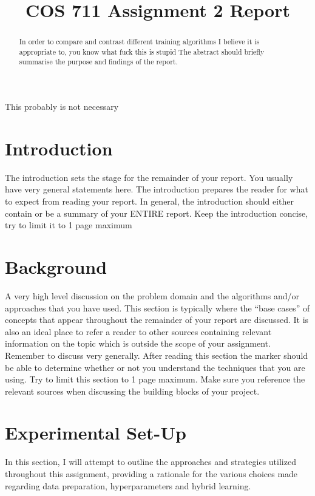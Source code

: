 \documentclass[conference]{IEEEtran}
\begin{document}
\title{COS 711 Assignment 2 Report\\
}

\author{
}

\maketitle

\begin{abstract}
In order to compare and contrast different training algorithms I believe it is appropriate to, you know what fuck this is stupid
The abstract should briefly summarise the purpose and findings of the report.
\end{abstract}

\begin{IEEEkeywords}
This probably is not necessary
\end{IEEEkeywords}

\section{Introduction}
The introduction sets the stage for the remainder of your report. You usually have very general statements here. The introduction prepares the reader for what to expect from reading your report. In general, the introduction should either contain or be a summary of your ENTIRE report. Keep the introduction concise, try to limit it to 1 page maximum

\section{Background}
A very high level discussion on the problem domain and the algorithms and/or approaches that you have used. This section is typically where the “base cases” of concepts that appear throughout the remainder of your report are discussed. It is also an ideal place to refer a reader to other sources containing relevant information on the topic which is outside the scope of your assignment. Remember to discuss very generally. After reading this section the marker should be able to determine whether or not you understand the techniques that you are using. Try to limit this section to 1 page maximum. Make sure you reference the relevant sources when discussing the building blocks of your project.

\section{Experimental Set-Up}
In this section, I will attempt to outline the approaches and strategies utilized throughout this assignment, providing a rationale for the various choices made regarding data preparation, hyperparameters and hybrid learning.
\end{document}
